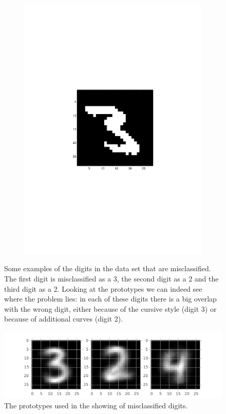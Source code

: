 \documentclass[paper=a4, fontsize=10pt]{scrartcl} %
\numberwithin{equation}{section} %
\numberwithin{figure}{section} %
\numberwithin{table}{section} %
\begin{document}
\begin{figure}[H]
\begin{subfigure}[b]{0.3\textwidth}
                \includegraphics[width=\textwidth]{error_3}
        \end{subfigure}
        \caption{Some examples of the digits in the data set that are misclassified. The first digit is misclassified as a 3, the second digit as a 2 and the third digit as a 2. Looking at the prototypes we can indeed see where the problem lies: in each of these digits there is a big overlap with the wrong digit, either because of the cursive style (digit 3) or because of additional curves (digit 2).}
        \label{error_digits}
\end{figure}

\begin{figure}[H]
	\centering
    \includegraphics[width=\textwidth]{error_prototypes}
    \caption{The prototypes used in the showing of misclassified digits.}
    \label{error_prototypes}
\end{figure}
\end{document}
